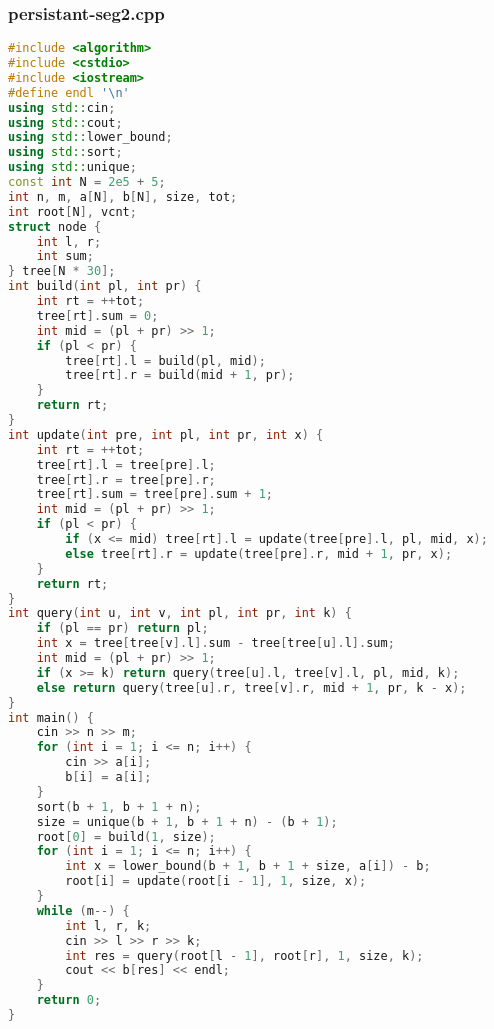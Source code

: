 \documentclass[9pt, a4paper, oneside]{book}
\begin{document}
\subsubsection{persistant-seg2.cpp}
\begin{lstlisting}[language={C++}]
#include <algorithm>
#include <cstdio>
#include <iostream>
#define endl '\n'
using std::cin;
using std::cout;
using std::lower_bound;
using std::sort;
using std::unique;
const int N = 2e5 + 5;
int n, m, a[N], b[N], size, tot;
int root[N], vcnt;
struct node {
    int l, r;
    int sum;
} tree[N * 30];
int build(int pl, int pr) {
    int rt = ++tot;
    tree[rt].sum = 0;
    int mid = (pl + pr) >> 1;
    if (pl < pr) {
        tree[rt].l = build(pl, mid);
        tree[rt].r = build(mid + 1, pr);
    }
    return rt;
}
int update(int pre, int pl, int pr, int x) {
    int rt = ++tot;
    tree[rt].l = tree[pre].l;
    tree[rt].r = tree[pre].r;
    tree[rt].sum = tree[pre].sum + 1;
    int mid = (pl + pr) >> 1;
    if (pl < pr) {
        if (x <= mid) tree[rt].l = update(tree[pre].l, pl, mid, x);
        else tree[rt].r = update(tree[pre].r, mid + 1, pr, x);
    }
    return rt;
}
int query(int u, int v, int pl, int pr, int k) {
    if (pl == pr) return pl;
    int x = tree[tree[v].l].sum - tree[tree[u].l].sum;
    int mid = (pl + pr) >> 1;
    if (x >= k) return query(tree[u].l, tree[v].l, pl, mid, k);
    else return query(tree[u].r, tree[v].r, mid + 1, pr, k - x);
}
int main() {
    cin >> n >> m;
    for (int i = 1; i <= n; i++) {
        cin >> a[i];
        b[i] = a[i];
    }
    sort(b + 1, b + 1 + n);
    size = unique(b + 1, b + 1 + n) - (b + 1);
    root[0] = build(1, size);
    for (int i = 1; i <= n; i++) {
        int x = lower_bound(b + 1, b + 1 + size, a[i]) - b;
        root[i] = update(root[i - 1], 1, size, x);
    }
    while (m--) {
        int l, r, k;
        cin >> l >> r >> k;
        int res = query(root[l - 1], root[r], 1, size, k);
        cout << b[res] << endl;
    }
    return 0;
}\end{lstlisting}
\end{document}
